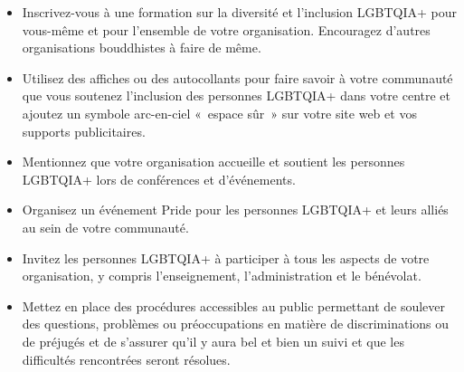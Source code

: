 \documentclass[12pt,openany]{book}
\begin{document}
\begin{itemize}[label=\textbullet]
  \setlength\itemsep{-0.3em}
  \item Inscrivez-vous à une formation sur la diversité et l’inclusion \mbox{LGBTQIA+} pour vous-même et pour l’ensemble de votre organisation. Encouragez d’autres organisations bouddhistes à faire de même.
  \item Utilisez des affiches ou des autocollants pour faire savoir à votre communauté que vous soutenez l’inclusion des personnes \mbox{LGBTQIA+} dans votre centre et ajoutez un symbole arc-en-ciel \mbox{« e}space sû\mbox{r »} sur votre site web et vos supports publicitaires.
  \item Mentionnez que votre organisation accueille et soutient les personnes \mbox{LGBTQIA+} lors de conférences et d’événements.
  \item Organisez un événement Pride pour les personnes \mbox{LGBTQIA+} et leurs alliés au sein de votre communauté.
  \item Invitez les personnes \mbox{LGBTQIA+} à participer à tous les aspects de votre organisation, y compris l’enseignement, l’administration et le bénévolat.
  \item Mettez en place des procédures accessibles au public permettant de soulever des questions, problèmes ou préoccupations en matière de discriminations ou de préjugés et de s’assurer qu’il y aura bel et bien un suivi et que les difficultés rencontrées seront résolues.
\end{itemize}

\newpage
\thispagestyle{empty}
\begin{figure}[h]
    \centering
\end{figure}
\end{document}

